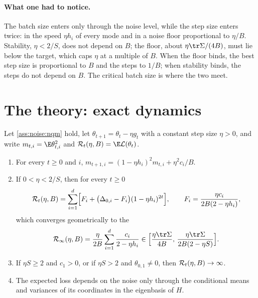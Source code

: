 \begin{refsection}
\paragraph{What one had to notice.} The batch size enters only through the noise level, while the step size enters twice: in the speed $\eta h_i$ of every mode and in a noise floor proportional to $\eta/B$. Stability, $\eta<2/S$, does not depend on $B$; the floor, about $\eta\tr\Sigma/(4B)$, must lie below the target, which caps $\eta$ at a multiple of $B$. When the floor binds, the best step size is proportional to $B$ and the steps to $1/B$; when stability binds, the steps do not depend on $B$. The critical batch size is where the two meet.

\section{The theory: exact dynamics}\label{sec:noise:exact}

\begin{theorem}\label{thm:noise:nqm}
Let \cref{ass:noise:nqm} hold, let $\theta_{t+1}=\theta_t-\eta g_t$ with a constant step size $\eta>0$, and write $m_{t,i}=\E\theta_{t,i}^2$ and $\cR_t(\eta,B)=\E\Loss(\theta_t)$.
\begin{enumerate}
\item For every $t\ge0$ and $i$, $m_{t+1,i}=(1-\eta h_i)^2m_{t,i}+\eta^2c_i/B$.
\item If $0<\eta<2/S$, then for every $t\ge0$
\begin{equation}\label{eq:noise:loss}
  \mathcal{R}_t(\eta,B)=\sum_{i=1}^d\Bigl[F_i+\bigl(\Delta_{0,i}-F_i\bigr)(1-\eta h_i)^{2t}\Bigr],\qquad F_i=\frac{\eta c_i}{2B(2-\eta h_i)},
\end{equation}
which converges geometrically to the 
\begin{equation}\label{eq:noise:floor}
  \cR_\infty(\eta,B)=\frac{\eta}{2B}\sum_{i=1}^d\frac{c_i}{2-\eta h_i}\in\Bigl[\frac{\eta\tr\Sigma}{4B},\,\frac{\eta\tr\Sigma}{2B(2-\eta S)}\Bigr].
\end{equation}
\item If $\eta S\ge2$ and $c_1>0$, or if $\eta S>2$ and $\theta_{0,1}\ne0$, then $\mathcal{R}_t(\eta,B)\to\infty$.
\item The expected loss depends on the noise only through the conditional means and variances of its coordinates in the eigenbasis of $H$.
\end{enumerate}
\end{theorem}


\end{refsection}
